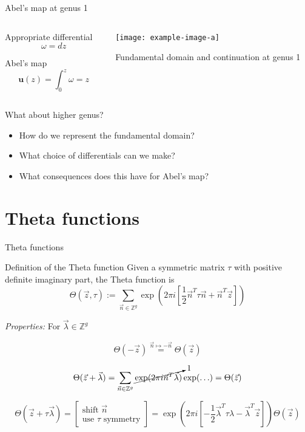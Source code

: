 \documentclass[11pt,aspectratio=169]{beamer}
\begin{document}
\begin{frame}{Abel's map at genus 1}
    \begin{columns}[onlytextwidth]
        \begin{column}{0.55\textwidth}
            Appropriate differential
            \[\omega = dz\]
            
            Abel's map
            \[\mathbf{u}(z) = \int_0^z \omega = z\]
        \end{column}
        \begin{column}{0.45\textwidth}
            \center
            \texttt{[image: example-image-a]}

            \tiny Fundamental domain and continuation at genus 1

            \cite{ImageSource}
        \end{column}
    \end{columns}

    {
    \begin{block}{What about higher genus?}
        \begin{itemize}
            \item How do we represent the fundamental domain?
            \item What choice of differentials can we make?
            \item What consequences does this have for Abel's map?
        \end{itemize}
    \end{block}
    }
\end{frame}

\section{Theta functions}

\begin{frame}{Theta functions}
    \begin{block}{Definition of the Theta function}
        Given a symmetric matrix $\tau$ with positive definite imaginary part, the Theta function is
        \[\Theta(\vec z, \tau) := \sum_{\vec n \in \mathbb Z^g} \exp \left(2 \pi i \left[ \frac{1}{2} \vec n^T \tau \vec n + \vec n^T \vec z \right]\right)\]
    \end{block}

    \emph{Properties:} For $\vec \lambda \in \mathbb Z^g$

    \[\Theta(-\vec z) \overset{\vec n \mapsto -\vec n}{=} \Theta(\vec z)\]

    \[\Theta(\vec z + \vec \lambda) = \sum_{\vec n \in \mathbb Z^g} \cancelto{1}{\exp(2\pi i \vec n^T \vec \lambda)} \exp(\ldots) = \Theta(\vec z)\]

    \[\Theta(\vec z + \tau \vec \lambda) = \begin{bmatrix} \text{shift } \vec n \\ \text{use }\tau\text{ symmetry}\end{bmatrix} = \exp\left(2\pi i\left[- \frac{1}{2}\vec \lambda^T \tau \lambda-\vec \lambda^T \vec z\right]\right)\Theta(\vec z)\]
\end{frame}
\end{document}
